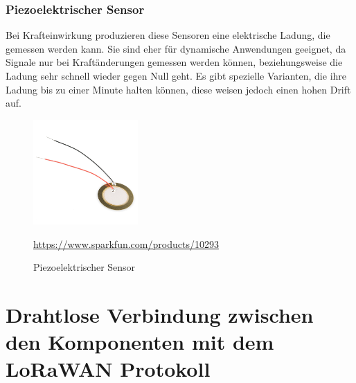 \subsection{Piezoelektrischer Sensor}
Bei Krafteinwirkung produzieren diese Sensoren eine elektrische Ladung, die gemessen werden kann. Sie sind eher für dynamische Anwendungen geeignet, da Signale nur bei Kraftänderungen gemessen werden können, beziehungsweise die Ladung sehr schnell wieder gegen Null geht. Es gibt spezielle Varianten, die ihre Ladung bis zu einer Minute halten können, diese weisen jedoch einen hohen Drift auf. 
\begin{figure}[ht]
    \center
    \includegraphics[width=4cm]{Bilder/waegezelle-ring.png}\\
    \caption{Piezoelektrischer Sensor}
    \begin{center} \quelle\url{https://www.sparkfun.com/products/10293} \end{center}
\end{figure}

\chapter{Drahtlose Verbindung zwischen den Komponenten mit dem LoRaWAN Protokoll}
